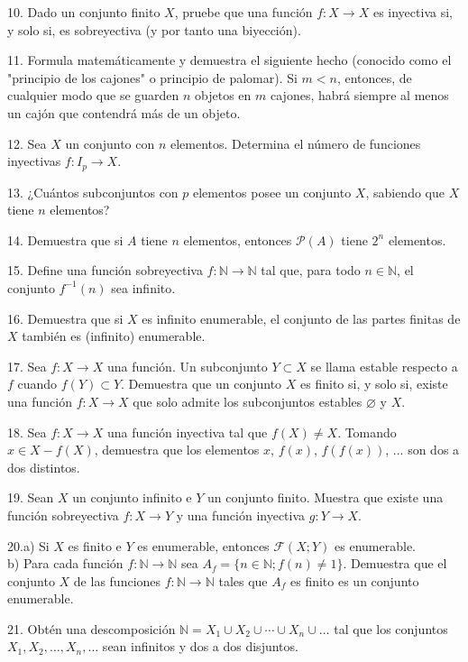 \documentclass[12pt,oneside]{book}
\begin{document}
10. Dado un conjunto finito \( X \), pruebe que una función \( f: X \to X \) es inyectiva si, y solo si, es sobreyectiva (y por tanto una biyección).

11. Formula matemáticamente y demuestra el siguiente hecho (conocido como el "principio de los cajones" o principio de palomar). Si \(m < n\), entonces, de cualquier modo que se guarden \(n\) objetos en \(m\) cajones, habrá siempre al menos un cajón que contendrá más de un objeto.

12. Sea \(X\) un conjunto con \(n\) elementos. Determina el número de funciones inyectivas \(f: I_p \to X\).

13. ¿Cuántos subconjuntos con \(p\) elementos posee un conjunto \(X\), sabiendo que \(X\) tiene \(n\) elementos?

14. Demuestra que si \(A\) tiene \(n\) elementos, entonces \(\mathcal{P}(A)\) tiene \(2^n\) elementos.

15. Define una función sobreyectiva \(f: \mathbb{N} \to \mathbb{N}\) tal que, para todo \(n \in \mathbb{N}\), el conjunto \(f^{-1}(n)\) sea infinito.

16. Demuestra que si \(X\) es infinito enumerable, el conjunto de las partes finitas de \(X\) también es (infinito) enumerable.

17. Sea \(f: X \to X\) una función. Un subconjunto \(Y \subset X\) se llama estable respecto a \(f\) cuando \(f(Y) \subset Y\). Demuestra que un conjunto \(X\) es finito si, y solo si, existe una función \(f: X \to X\) que solo admite los subconjuntos estables \(\varnothing\) y \(X\).

18. Sea \(f: X \to X\) una función inyectiva tal que \(f(X) \neq X\). Tomando \(x \in X - f(X)\), demuestra que los elementos \(x\), \(f(x)\), \(f(f(x))\), ... son dos a dos distintos.

19. Sean \(X\) un conjunto infinito e \(Y\) un conjunto finito. Muestra que existe una función sobreyectiva \(f: X \to Y\) y una función inyectiva \(g: Y \to X\).

20.a) Si \(X\) es finito e \(Y\) es enumerable, entonces \(\mathcal{F}(X; Y)\) es enumerable.\\
b) Para cada función \(f: \mathbb{N} \to \mathbb{N}\) sea \(A_f = \{ n \in \mathbb{N} ; f(n) \neq 1 \}\). Demuestra que el conjunto \(X\) de las funciones \(f: \mathbb{N} \to \mathbb{N}\) tales que \(A_f\) es finito es un conjunto enumerable.

21. Obtén una descomposición \( \mathbb{N} = X_1 \cup X_2 \cup \cdots \cup X_n \cup \ldots \) tal que los conjuntos \( X_1, X_2, \ldots, X_n, \ldots \) sean infinitos y dos a dos disjuntos.
\end{document}
